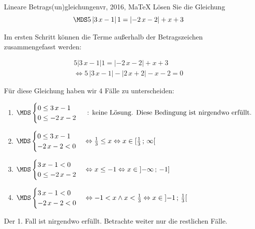  \providecommand{\MoIl}[1][]{\mbox{}#1]\mathopen{}} 
 \providecommand{\MoIr}[1][]{#1[\mbox{}} 
 \providecommand{\MIntvlSep}{;} 
 \providecommand{\MElSetSep}{\, ; \, } 
 \begin{MAufgabe}{Lineare Betrags(un)gleichungen}{vr, 2016, MaTeX}
L\"osen Sie die Gleichung
$$
 \MDS 5\left| 3\, x - 1 \right|1=  \left|  - 2\, x - 2 \right| +x + 3
$$  

\ifLsg\MLoesung

Im ersten Schritt k\"onnen die Terme au\ss{}erhalb der Betragszeichen zusammengefasst werden:

\begin{align*} 
 5\left| 3\, x - 1 \right|1=  \left|  - 2\, x - 2 \right| +x + 3\\ 
\Leftrightarrow5\, \left|3\, x - 1\right| - \left|2\, x + 2\right| - x - 2= 0 
 \end{align*}

F\"ur diese Gleichung haben wir 4 F\"alle zu unterscheiden: 
\begin{enumerate}
\item $ \MDS 
\begin{cases} 
 0 \leq 3\, x - 1\\ 
0 \leq  - 2\, x - 2
 \end{cases}
 \mbox{ : keine L\"osung. Diese Bedingung ist nirgendwo erf\"ullt.}$ 
\item $ \MDS 
\begin{cases} 
 0 \leq 3\, x - 1\\ 
 - 2\, x - 2 < 0
 \end{cases}
\Leftrightarrow \frac{1}{3} \leq x\Leftrightarrow x \in [ \frac{1}{3} \, \MIntvlSep \, \infty\MoIr $ 
\item $ \MDS 
\begin{cases} 
 3\, x - 1 < 0\\ 
0 \leq  - 2\, x - 2
 \end{cases}
\Leftrightarrow x \leq -1\Leftrightarrow x \in \MoIl  -\infty \, \MIntvlSep \, -1]$ 
\item $ \MDS 
\begin{cases} 
 3\, x - 1 < 0\\ 
 - 2\, x - 2 < 0
 \end{cases}
\Leftrightarrow -1 < x \wedge x < \frac{1}{3}\Leftrightarrow x \in \MoIl  -1 \, \MIntvlSep \, \frac{1}{3}\MoIr $ 
\end{enumerate} 
Der 1. Fall ist nirgendwo erf\"ullt. Betrachte weiter nur die restlichen F\"alle.
 

\end{MAufgabe}

